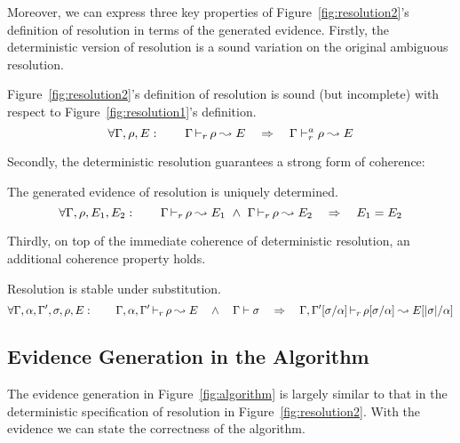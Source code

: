 Moreover, we can express three key properties of Figure~\ref{fig:resolution2}'s
definition of resolution in terms of the generated evidence.
Firstly, the deterministic version of resolution is a sound variation on the original ambiguous resolution.
\begin{lemma}[Soundness]
Figure~\ref{fig:resolution2}'s definition of resolution is sound (but
incomplete) with respect to Figure~\ref{fig:resolution1}'s definition.
\[\forall \Gamma, \rho, E: \quad\quad \Gamma \mathop{\vdash_{r}} \rho \leadsto E \quad\Rightarrow\quad \Gamma \vdash^a_{r} \rho \leadsto E \]
\end{lemma}
Secondly, the deterministic resolution guarantees a strong form of coherence:
\begin{lemma}[Determinacy]
The generated evidence of resolution is uniquely determined.
\[\forall \Gamma, \rho, E_1, E_2: \quad\quad \Gamma \mathop{\vdash_{r}} \rho \leadsto E_1 ~\wedge~ \Gamma \mathop{\vdash_{r}} \rho \leadsto E_2 \quad\Rightarrow\quad E_1 = E_2 \]
\end{lemma}
Thirdly, on top of the immediate coherence of deterministic resolution, 
an additional coherence property holds.  
\begin{lemma}[Stability]
Resolution is stable under substitution.
\[\forall \Gamma,\alpha,\Gamma',\sigma,\rho, E: \quad\quad 
\Gamma,\alpha,\Gamma' \mathop{\vdash_{r}} \rho \leadsto E \quad\wedge\quad \Gamma \vdash \sigma
\quad\Rightarrow\quad 
\Gamma,\Gamma'[\sigma/\alpha] \mathop{\vdash_{r}} \rho[\sigma/\alpha] \leadsto E[|\sigma|/\alpha] \]
\end{lemma}

\subsection{Evidence Generation in the Algorithm}

The evidence generation in Figure~\ref{fig:algorithm} is largely similar to
that in the deterministic specification of resolution in
Figure~\ref{fig:resolution2}.
With the evidence we can state the correctness of the algorithm.

